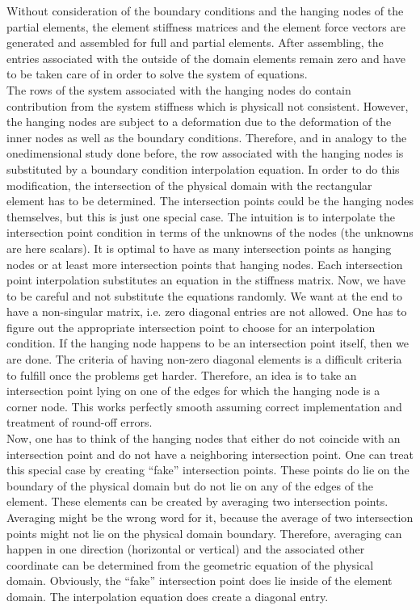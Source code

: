 \documentclass[a4paper,12pt]{article}
\begin{document}
Without consideration of the boundary conditions and the hanging nodes of the partial elements, the element stiffness matrices and the element force vectors are generated and assembled for full and partial elements. After assembling, the entries associated with the outside of the domain elements remain zero and have to be taken care of in order to solve the system of equations. \\
The rows of the system associated with the hanging nodes do contain contribution from the system stiffness which is physicall not consistent. However, the hanging nodes are subject to a deformation due to the deformation of the inner nodes as well as the boundary conditions. Therefore, and in analogy to the onedimensional study done before, the row associated with the hanging nodes is substituted by a boundary condition interpolation equation. In order to do this modification, the intersection of the physical domain with the rectangular element has to be determined. The intersection points could be the hanging nodes themselves, but this is just one special case. The intuition is to interpolate the intersection point condition in terms of the unknowns of the nodes (the unknowns are here scalars). It is optimal to have as many intersection points as hanging nodes or at least more intersection points that hanging nodes. Each intersection point interpolation substitutes an equation in the stiffness matrix. Now, we have to be careful and not substitute the equations randomly. We want at the end to have a non-singular matrix, i.e. zero diagonal entries are not allowed. One has to figure out the appropriate intersection point to choose for an interpolation condition. If the hanging node happens to be an intersection point itself, then we are done. The criteria of having non-zero diagonal elements is a difficult criteria to fulfill once the problems get harder.  Therefore, an idea is to take an intersection point lying on one of the edges for which the hanging node is a corner node. This works perfectly smooth assuming correct implementation and treatment of round-off errors.\\
Now, one has to think of the hanging nodes that either do not coincide with an intersection point and do not have a neighboring intersection point. One can treat this special case by creating ``fake'' intersection points. These points do lie on the boundary of the physical domain but do not lie on any of the edges of the element. These elements can be created by averaging two intersection points. Averaging might be the wrong word for it, because the average of two intersection points might not lie on the physical domain boundary. Therefore, averaging can happen in one direction (horizontal or vertical) and the associated other coordinate can be determined from the geometric equation of the physical domain. Obviously, the ``fake'' intersection point does lie inside of the element domain. The interpolation equation does create a diagonal entry.\\
\end{document}
